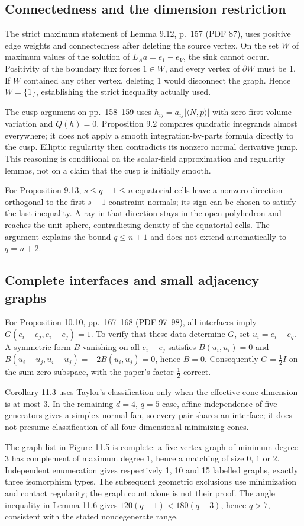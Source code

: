\documentclass[10pt]{article}
\begin{document}
\subsection*{Connectedness and the dimension restriction}
The strict maximum statement of Lemma 9.12, p. 157 (PDF 87), uses positive edge weights and connectedness after deleting the source vertex. On the set \(W\) of maximum values of the solution of \(L_Aa=e_1-e_V\), the sink cannot occur. Positivity of the boundary flux forces \(1\in W\), and every vertex of \(\partial W\) must be 1. If \(W\) contained any other vertex, deleting 1 would disconnect the graph. Hence \(W=\{1\}\), establishing the strict inequality actually used.\par
The cusp argument on pp. 158–159 uses \(h_{ij}=a_{ij}|\langle N,p\rangle|\) with zero first volume variation and \(Q(h)=0\). Proposition 9.2 compares quadratic integrands almost everywhere; it does not apply a smooth integration-by-parts formula directly to the cusp. Elliptic regularity then contradicts its nonzero normal derivative jump. This reasoning is conditional on the scalar-field approximation and regularity lemmas, not on a claim that the cusp is initially smooth.\par
For Proposition 9.13, \(s\leq q-1\leq n\) equatorial cells leave a nonzero direction orthogonal to the first \(s-1\) constraint normals; its sign can be chosen to satisfy the last inequality. A ray in that direction stays in the open polyhedron and reaches the unit sphere, contradicting density of the equatorial cells. The argument explains the bound \(q\leq n+1\) and does not extend automatically to \(q=n+2\).\par
\subsection*{Complete interfaces and small adjacency graphs}
For Proposition 10.10, pp. 167–168 (PDF 97–98), all interfaces imply \(G(e_i-e_j,e_i-e_j)=1\). To verify that these data determine \(G\), set \(u_i=e_i-e_q\). A symmetric form \(B\) vanishing on all \(e_i-e_j\) satisfies \(B(u_i,u_i)=0\) and \(B(u_i-u_j,u_i-u_j)=-2B(u_i,u_j)=0\), hence \(B=0\). Consequently \(G=\tfrac12 I\) on the sum-zero subspace, with the paper’s factor \(\tfrac12\) correct.\par
Corollary 11.3 uses Taylor’s classification only when the effective cone dimension is at most 3. In the remaining \(d=4\), \(q=5\) case, affine independence of five generators gives a simplex normal fan, so every pair shares an interface; it does not presume classification of all four-dimensional minimizing cones.\par
The graph list in Figure 11.5 is complete: a five-vertex graph of minimum degree 3 has complement of maximum degree 1, hence a matching of size 0, 1 or 2. Independent enumeration gives respectively 1, 10 and 15 labelled graphs, exactly three isomorphism types. The subsequent geometric exclusions use minimization and contact regularity; the graph count alone is not their proof. The angle inequality in Lemma 11.6 gives \(120(q-1)<180(q-3)\), hence \(q>7\), consistent with the stated nondegenerate range.\par
\end{document}

